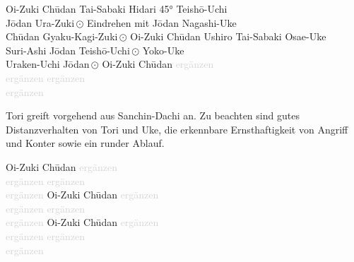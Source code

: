 \clearpage
\newpage
\begin{tcbitemize}[right=4pt,left=4pt,raster columns=3,raster equal height,colframe=GKD,colback=white,fonttitle=\bfseries]
	\tcbitem[squeezed title*={Kumite Ura 7}]
	Oi-Zuki Ch\={u}dan
	Tai-Sabaki Hidari 45° Teish\={o}-Uchi\\
	J\={o}dan Ura-Zuki\,\(\odot\)
	Eindrehen mit J\={o}dan Nagashi-Uke\\
	Ch\={u}dan Gyaku-Kagi-Zuki\,\(\odot\)
	\tcbitem[squeezed title*={Kumite Ura 8}]
	Oi-Zuki Ch\={u}dan
	Ushiro Tai-Sabaki Osae-Uke\\
	Suri-Ashi J\={o}dan Teish\={o}-Uchi\,\(\odot\)
	Yoko-Uke \\
	Uraken-Uchi J\={o}dan\,\(\odot\)
	\tcbitem[squeezed title*={Kumite Ura 9}]
	Oi-Zuki Ch\={u}dan
	\textcolor{lightgray}{ergänzen}\\
	\textcolor{lightgray}{ergänzen}
	\textcolor{lightgray}{ergänzen}\\
	\textcolor{lightgray}{ergänzen}
\end{tcbitemize}
\null\vfill\null
\begin{pfbox}
	Tori greift vorgehend aus Sanchin-Dachi an. Zu beachten sind gutes Distanzverhalten von Tori und Uke, die erkennbare Ernsthaftigkeit von Angriff und Konter sowie ein runder Ablauf.
\end{pfbox}
\null\vfill\null
\begin{tcbitemize}[right=4pt,left=4pt,raster columns=3,raster equal height,colframe=GKD,colback=white,fonttitle=\bfseries]
	\tcbitem[squeezed title*={Kumite Ura 10}]
	Oi-Zuki Ch\={u}dan
	\textcolor{lightgray}{ergänzen}\\
	\textcolor{lightgray}{ergänzen}
	\textcolor{lightgray}{ergänzen}\\
	\textcolor{lightgray}{ergänzen}
	\tcbitem[squeezed title*={Kumite Ura 11}]
	Oi-Zuki Ch\={u}dan
	\textcolor{lightgray}{ergänzen}\\
	\textcolor{lightgray}{ergänzen}
	\textcolor{lightgray}{ergänzen}\\
	\textcolor{lightgray}{ergänzen}
	\tcbitem[squeezed title*={Kumite Ura 12}]
	Oi-Zuki Ch\={u}dan
	\textcolor{lightgray}{ergänzen}\\
	\textcolor{lightgray}{ergänzen}
	\textcolor{lightgray}{ergänzen}\\
	\textcolor{lightgray}{ergänzen}
\end{tcbitemize}
\clearpage
\newpage